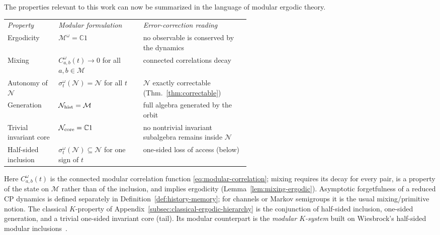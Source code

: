\documentclass[a4paper,11pt]{article}
\theoremstyle{definition}
\newcommand{\mN}{\mathcal{N}}
\newcommand{\mM}{\mathcal{M}}
\begin{document}
The properties relevant to this work can now be summarized in the language of modular ergodic theory.
\begin{center}
\small
\renewcommand{\arraystretch}{1.15}
\begin{tabularx}{\linewidth}{@{}>{\raggedright\arraybackslash}p{0.21\linewidth}
                              >{\raggedright\arraybackslash}p{0.35\linewidth}
                              >{\raggedright\arraybackslash}X@{}}
 \textit{Property} & \textit{Modular formulation} & \textit{Error-correction reading}\\[4pt]
 Ergodicity & $\mM^\omega=\mathbb C1$ & no observable is conserved by the dynamics\\
 Mixing & $C_{a,b}^\omega(t)\to0$ for all $a,b\in\mM$ & connected correlations decay\\
 Autonomy of $\mN$ & $\sigma^\omega_t(\mN)=\mN$ for all $t$ & $\mN$ exactly correctable (Thm.~\ref{thm:correctable})\\
 Generation & $\mN_{\rm hist}=\mM$ & full algebra generated by the orbit\\
 Trivial invariant core & $\mN_{\rm core}=\mathbb C1$ & no nontrivial invariant subalgebra remains inside $\mN$\\
 Half-sided inclusion & $\sigma^\omega_t(\mN)\subseteq\mN$ for one sign of $t$ & one-sided loss of access (below)
\end{tabularx}
\end{center}
Here $C^\omega_{a,b}(t)$ is the connected modular correlation function \eqref{eq:modular-correlation}; mixing requires its decay for every pair, is a property of the state on $\mM$ rather than of the inclusion, and implies ergodicity (Lemma~\ref{lem:mixing-ergodic}). Asymptotic forgetfulness of a reduced CP dynamics is defined separately in Definition~\ref{def:history-memory}; for channels or Markov semigroups it is the usual mixing/primitive notion. The classical $K$-property of Appendix~\ref{subsec:classical-ergodic-hierarchy} is the conjunction of half-sided inclusion, one-sided generation, and a trivial one-sided invariant core (tail). Its modular counterpart is the \emph{modular $K$-system} built on Wiesbrock's half-sided modular inclusions~\cite{Wiesbrock1993}.
\end{document}
